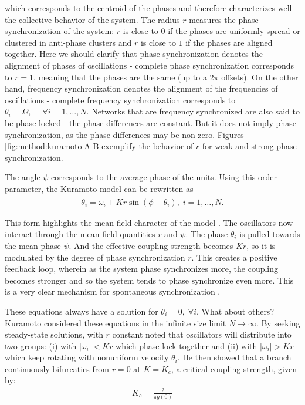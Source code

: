 which corresponds to the centroid of the phases and therefore characterizes well the collective behavior of the system. The radius $r$ measures the phase synchronization of the system: $r$ is close to $0$ if the phases are uniformly spread or clustered in anti-phase clusters and $r$ is close to $1$ if the phases are aligned together. Here we should clarify that phase synchronization denotes the alignment of phases of oscillations - complete phase synchronization corresponds to $r=1$, meaning that the phases are the same (up to a $2\pi$ offsets). On the other hand, frequency synchronization denotes the alignment of the frequencies of oscillations - complete frequency synchronization corresponds to $\dot{\theta_i} = \Omega, \; \quad \forall i=1,\ldots, N$. Networks that are frequency synchronized are also said to be phase-locked - the phase differences are constant. But it does not imply phase synchronization, as the phase differences may be non-zero. Figures \ref{fig:method:kuramoto}A-B exemplify the behavior of $r$ for weak and strong phase synchronization.

The angle $\psi$ corresponds to the average phase of the units. Using this order parameter, the Kuramoto model can be rewritten as
\begin{align}
    \dot{\theta}_i = \omega_i + Kr\sin(\phi - \theta_i), \; i=1,\ldots,N.
\end{align} 

This form highlights the mean-field character of the model \cite{strogatz2000from}. The oscillators now interact through the mean-field quantities $r$ and $\psi$. The phase $\theta_i$ is pulled towards the mean phase $\psi$. And the effective coupling strength becomes $Kr$, so it is modulated by the degree of phase synchronization $r$. This creates a positive feedback loop, wherein as the system phase synchronizes more, the coupling becomes stronger and so the system tends to phase synchronize even more. This is a very clear mechanism for spontaneous synchronization \cite{strogatz2000from}. 


These equations always have a solution for $\theta_i = 0, \; \forall i$. What about others? Kuramoto considered these equations in the infinite size limit $N\to\infty$. By seeking steady-state solutions, with $r$ constant noted that oscillators will distribute into two groups: (i) with $|\omega_i| < Kr$ which phase-lock together and (ii) with $|\omega_i| > Kr$ which keep rotating with nonuniform velocity $\dot{\theta}_i$.  He then showed that a branch continuously bifurcaties from $r=0$ at $K=K_c$, a critical coupling strength, given by:
%
\begin{align}
    K_c = \frac{2}{\pi g(0)}
\end{align}

